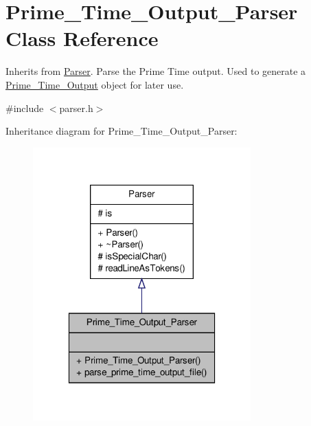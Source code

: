 \hypertarget{classPrime__Time__Output__Parser}{\section{Prime\-\_\-\-Time\-\_\-\-Output\-\_\-\-Parser Class Reference}
\label{classPrime__Time__Output__Parser}
}


Inherits from \hyperlink{classParser}{Parser}. Parse the Prime Time output. Used to generate a \hyperlink{classPrime__Time__Output__Parser_1_1Prime__Time__Output}{Prime\-\_\-\-Time\-\_\-\-Output} object for later use.  




{\ttfamily \#include $<$parser.\-h$>$}



Inheritance diagram for Prime\-\_\-\-Time\-\_\-\-Output\-\_\-\-Parser\-:\nopagebreak
\begin{figure}[H]
\begin{center}
\leavevmode
\includegraphics[width=238pt]{classPrime__Time__Output__Parser__inherit__graph}
\end{center}
\end{figure}


